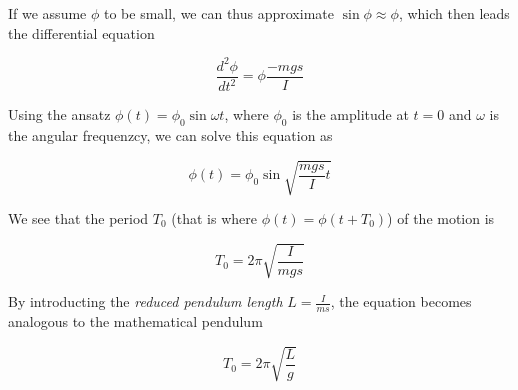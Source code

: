 \documentclass[a4paper,german,12pt,smallheadings]{scrartcl}
\begin{document}
If we assume $\phi$ to be small, we can thus approximate $\sin \phi \approx
\phi$, which then leads the differential equation

\begin{equation}
  \frac{d^2 \phi}{d t^2} = \phi \frac{-mgs}{I}
\end{equation}

Using the ansatz $\phi(t) = \phi_0 \sin \omega t$, where $\phi_0$ is the
amplitude at $t=0$ and $\omega$ is the angular frequenzcy, we can solve this
equation as

\begin{equation}
  \phi(t) = \phi_0 \sin \sqrt{\frac{mgs}{I} t}
\end{equation}

We see that the period $T_0$ (that is where $\phi(t) = \phi(t + T_0)$) of the motion is

\begin{equation}
  T_0 = 2 \pi \sqrt{\frac{I}{mgs}}
\end{equation}

By introducting the \textit{reduced pendulum length} $L = \frac{I}{ms}$, the
equation becomes analogous to the mathematical pendulum

\begin{equation}
  T_0 = 2 \pi \sqrt{\frac{L}{g}}
\end{equation}
\end{document}
